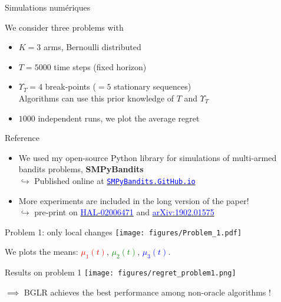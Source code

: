 \documentclass[11pt,french,ignorenonframetext,]{beamer}
\begin{document}
\begin{frame}{Simulations numériques}

  \begin{block}{We consider three problems with}
    \begin{itemize}
      \item
      $K=3$ arms, Bernoulli distributed
      \item
      $T=5000$ time steps (fixed horizon)
      \item
      $\Upsilon_T=4$ break-points ($=5$ stationary sequences)\\
      Algorithms can use this prior knowledge of $T$ and $\Upsilon_T$
      \item
      $1000$ independent runs, we plot the average regret
    \end{itemize}
  \end{block}

  \pause

  \begin{exampleblock}{Reference}
    \begin{itemize}
      \item
      We used my open-source Python library for simulations of multi-armed bandits problems, \textbf{SMPyBandits}
      \\
      $\hookrightarrow$ Published online at \href{https://SMPyBandits.GitHub.io}{\textcolor{blue}{\texttt{SMPyBandits.GitHub.io}}}
      \item
      More experiments are included in the long version of the paper!\\
      $\hookrightarrow$ pre-print on
      \href{https://hal.inria.fr/hal-02006471}{\textcolor{blue}{HAL-02006471}}
      and
      \href{https://arxiv.org/abs/1902.01575}{\textcolor{blue}{arXiv:1902.01575}}
    \end{itemize}
  \end{exampleblock}

\end{frame}


\begin{frame}[plain]{Problem 1: only local changes}
  \centering
  \texttt{[image: figures/Problem\_1.pdf]}

  We plots the means:
  \textcolor{red}{$\mu_1(t)$},
  \textcolor{green}{$\mu_2(t)$},
  \textcolor{blue}{$\mu_3(t)$}.
\end{frame}

\begin{frame}[plain]{Results on problem 1}
  \centering
  \texttt{[image: figures/regret\_problem1.png]}

  $\implies$ BGLR achieves the best performance among non-oracle algorithms \dCooley{} !
\end{frame}
\end{document}
